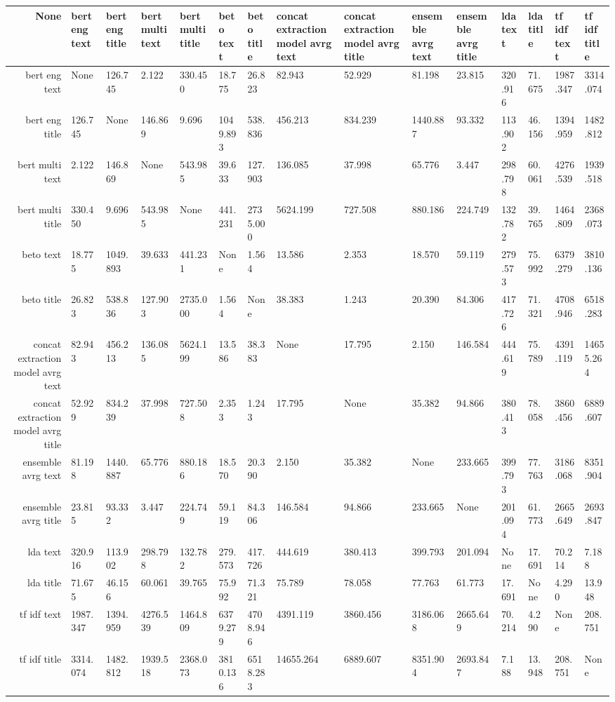 \begin{tabular}{|r|l|l|l|l|l|l|l|l|l|l|l|l|l|l|}
  \hline
  None & bert eng text & bert eng title & bert multi text & bert multi title & beto text & beto title & concat extraction model avrg text & concat extraction model avrg title & ensemble avrg text & ensemble avrg title & lda text & lda title & tf idf text & tf idf title \\ 
  \hline
  bert eng text & None & 126.745 & 2.122 & 330.450 & 18.775 & 26.823 & 82.943 & 52.929 & 81.198 & 23.815 & 320.916 & 71.675 & 1987.347 & 3314.074 \\ 
  \hline
  bert eng title & 126.745 & None & 146.869 & 9.696 & 1049.893 & 538.836 & 456.213 & 834.239 & 1440.887 & 93.332 & 113.902 & 46.156 & 1394.959 & 1482.812 \\ 
  \hline
  bert multi text & 2.122 & 146.869 & None & 543.985 & 39.633 & 127.903 & 136.085 & 37.998 & 65.776 & 3.447 & 298.798 & 60.061 & 4276.539 & 1939.518 \\ 
  \hline
  bert multi title & 330.450 & 9.696 & 543.985 & None & 441.231 & 2735.000 & 5624.199 & 727.508 & 880.186 & 224.749 & 132.782 & 39.765 & 1464.809 & 2368.073 \\ 
  \hline
  beto text & 18.775 & 1049.893 & 39.633 & 441.231 & None & 1.564 & 13.586 & 2.353 & 18.570 & 59.119 & 279.573 & 75.992 & 6379.279 & 3810.136 \\ 
  \hline
  beto title & 26.823 & 538.836 & 127.903 & 2735.000 & 1.564 & None & 38.383 & 1.243 & 20.390 & 84.306 & 417.726 & 71.321 & 4708.946 & 6518.283 \\ 
  \hline
  concat extraction model avrg text & 82.943 & 456.213 & 136.085 & 5624.199 & 13.586 & 38.383 & None & 17.795 & 2.150 & 146.584 & 444.619 & 75.789 & 4391.119 & 14655.264 \\ 
  \hline
  concat extraction model avrg title & 52.929 & 834.239 & 37.998 & 727.508 & 2.353 & 1.243 & 17.795 & None & 35.382 & 94.866 & 380.413 & 78.058 & 3860.456 & 6889.607 \\ 
  \hline
  ensemble avrg text & 81.198 & 1440.887 & 65.776 & 880.186 & 18.570 & 20.390 & 2.150 & 35.382 & None & 233.665 & 399.793 & 77.763 & 3186.068 & 8351.904 \\ 
  \hline
  ensemble avrg title & 23.815 & 93.332 & 3.447 & 224.749 & 59.119 & 84.306 & 146.584 & 94.866 & 233.665 & None & 201.094 & 61.773 & 2665.649 & 2693.847 \\ 
  \hline
  lda text & 320.916 & 113.902 & 298.798 & 132.782 & 279.573 & 417.726 & 444.619 & 380.413 & 399.793 & 201.094 & None & 17.691 & 70.214 & 7.188 \\ 
  \hline
  lda title & 71.675 & 46.156 & 60.061 & 39.765 & 75.992 & 71.321 & 75.789 & 78.058 & 77.763 & 61.773 & 17.691 & None & 4.290 & 13.948 \\ 
  \hline
  tf idf text & 1987.347 & 1394.959 & 4276.539 & 1464.809 & 6379.279 & 4708.946 & 4391.119 & 3860.456 & 3186.068 & 2665.649 & 70.214 & 4.290 & None & 208.751 \\ 
  \hline
  tf idf title & 3314.074 & 1482.812 & 1939.518 & 2368.073 & 3810.136 & 6518.283 & 14655.264 & 6889.607 & 8351.904 & 2693.847 & 7.188 & 13.948 & 208.751 & None \\ 
  \hline
\end{tabular}
